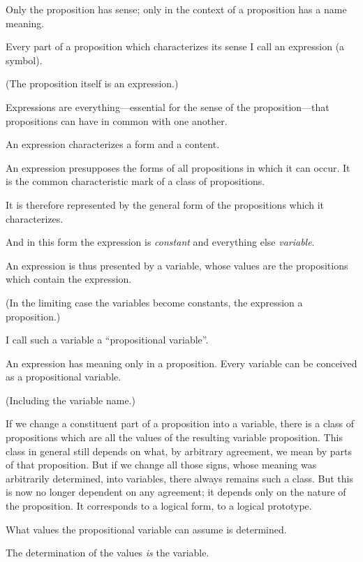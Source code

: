 {Only the proposition has sense; only in the
context of a proposition has a name meaning.}


{Every part of a proposition which characterizes
its sense I call an expression (a symbol).

(The proposition itself is an expression.)

Expressions are everything---essential for the
sense of the prop\-o\-si\-tion---that propositions can
have in common with one another.

An expression characterizes a form and a
content.}


{An expression presupposes the forms of all
propositions in which it can occur. It is the
common characteristic mark of a class of propositions.}


{It is therefore represented by the general form
of the propositions which it characterizes.

And in this form the expression is \emph{constant} and
everything else \emph{variable}.}


{An expression is thus presented by a variable,
whose values are the propositions which contain
the expression.

(In the limiting case the variables become
constants, the expression a proposition.)

I call such a variable a ``propositional variable''.}


{An expression has meaning only in a proposition.
Every variable can be conceived as a
propositional variable.

(Including the variable name.)}


{If we change a constituent part of a proposition
into a variable, there is a class of propositions
which are all the values of the resulting variable
proposition. This class in general still depends
on what, by arbitrary agreement, we mean by
parts of that proposition. But if we change all
those signs, whose meaning was arbitrarily determined,
into variables, there always remains such
a class. But this is now no longer dependent on
any agreement; it depends only on the nature of
the proposition. It corresponds to a logical form,
to a logical prototype.}


{What values the propositional variable can
assume is determined.

The determination of the values \emph{is} the variable.}


